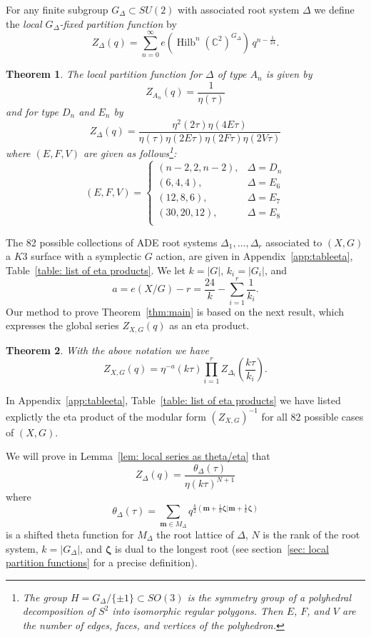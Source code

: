 \documentclass{article}
\newtheorem{theorem}{Theorem}[section]
\theoremstyle{definition}
\newcommand{\CC} {{\mathbb C}}          %
\newcommand{\mvec}{\bm{m}}
\newcommand{\zetavec}{\bm{\zeta }}
\newcommand{\Hilb}{\operatorname{Hilb}}
\begin{document}
For any finite subgroup $G_{\Delta}\subset SU(2)$ with associated root
system $\Delta$ we define the \emph{local $G_{\Delta }$-fixed
partition function} by
\[
Z_{\Delta} (q) = \sum_{n=0}^{\infty}
e\left(\Hilb^{n}(\CC^{2})^{G_{\Delta}} \right) \, q^{n-\frac{1}{24}} .
\]
\begin{theorem}\label{thm: formula for local series (in intro)}
The local partition function for $\Delta$ of type $A_{n}$ is given by 
\[
Z_{A_{n}}(q) = \frac{1}{\eta (\tau )}
\]
and for type $D_{n}$ and $E_{n}$ by
\[
Z_{\Delta}(q) = \frac{\eta^{2}(2\tau )\eta (4E\tau )}{\eta (\tau )\eta (2E\tau )\eta (2F\tau )\eta (2V\tau )}
\]
where $(E,F,V)$ are given as follows\footnote{The group $H = G_{\Delta}/\{\pm
1 \}\subset SO(3)$ is the symmetry group of a polyhedral decomposition
of $S^{2}$ into isomorphic regular polygons. Then $E$, $F$, and $V$
are the number of edges, faces, and vertices of the polyhedron.}:
\[
(E,F,V) = \begin{cases}
(n-2,2,n-2), & \Delta =D_{n}\\
(6,4,4), & \Delta =E_{6}\\
(12,8,6), & \Delta =E_{7}\\
(30,20,12), & \Delta =E_{8}\\
\end{cases}
\]
\end{theorem}



The 82 possible collections of ADE root systems $\Delta_{1},\dots
,\Delta_{r}$ associated to $(X,G)$ a $K3$ surface with a symplectic
$G$ action, are given in Appendix~\ref{app:tableeta},
Table~\ref{table: list of eta products}. We let $k=|G|$,
$k_{i}=|G_{i}|$, and
\[
a = e(X/G) - r=\frac{24}{k}-\sum_{i=1}^{r} \frac{1}{k_{i}}.
\]
Our method to prove Theorem~\ref{thm:main} is based on the next
result, which expresses the global series $Z_{X,G}(q)$ as an eta
product.
\begin{theorem}\label{thm: eta product formula for Z}
With the above notation we have
\[
Z_{X,G}(q) = \eta^{-a}(k\tau )\prod_{i=1}^{r}
Z_{\Delta_{i}}\left(\frac{k\tau}{k_{i}} \right).
\]
\end{theorem}



In Appendix~\ref{app:tableeta}, Table~\ref{table: list of eta
products} we have listed explictly the eta product of the modular form
$(Z_{X,G})^{-1}$ for all 82 possible cases of $(X,G)$.


We will prove in Lemma~\ref{lem: local series as theta/eta}  that
\[
Z_{\Delta}(q) =\frac{\theta_{\Delta}(\tau)}{\eta (k\tau )^{N+1}}
\]
where 
\[
\theta_{\Delta}(\tau ) = \sum_{\mvec \in M_{\Delta}}
q^{\frac{k}{2}\left(\mvec +\frac{1}{k}\zetavec |\mvec
+\frac{1}{k}\zetavec \right)}
\]
is a shifted theta function for $M_{\Delta} $ the root lattice of
$\Delta$, $N$ is the rank of the root system, $k=|G_{\Delta}|$, and
$\zetavec$ is dual to the longest root (see section~\ref{sec: local
partition functions} for a precise definition).
\end{document}

